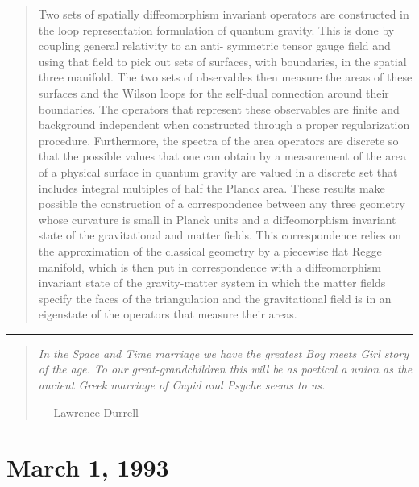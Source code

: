 \documentclass[12pt]{article}
\def\tightlist{}
\renewcommand{\texttt}[1]{%
  \begingroup
  \ttfamily
  \begingroup\lccode`~=`/\lowercase{\endgroup\def~}{/\discretionary{}{}{}}%
  \begingroup\lccode`~=`[\lowercase{\endgroup\def~}{[\discretionary{}{}{}}%
  \begingroup\lccode`~=`.\lowercase{\endgroup\def~}{.\discretionary{}{}{}}%
  \catcode`/=\active\catcode`[=\active\catcode`.=\active
  \scantokens{#1\noexpand}%
  \endgroup
}
\begin{document}
\begin{quote}
Two sets of spatially diffeomorphism invariant operators are constructed
in the loop representation formulation of quantum gravity. This is done
by coupling general relativity to an anti- symmetric tensor gauge field
and using that field to pick out sets of surfaces, with boundaries, in
the spatial three manifold. The two sets of observables then measure the
areas of these surfaces and the Wilson loops for the self-dual
connection around their boundaries. The operators that represent these
observables are finite and background independent when constructed
through a proper regularization procedure. Furthermore, the spectra of
the area operators are discrete so that the possible values that one can
obtain by a measurement of the area of a physical surface in quantum
gravity are valued in a discrete set that includes integral multiples of
half the Planck area. These results make possible the construction of a
correspondence between any three geometry whose curvature is small in
Planck units and a diffeomorphism invariant state of the gravitational
and matter fields. This correspondence relies on the approximation of
the classical geometry by a piecewise flat Regge manifold, which is then
put in correspondence with a diffeomorphism invariant state of the
gravity-matter system in which the matter fields specify the faces of
the triangulation and the gravitational field is in an eigenstate of the
operators that measure their areas.
\end{quote}

\begin{center}\rule{0.5\linewidth}{0.5pt}\end{center}

\begin{quote}
\emph{In the Space and Time marriage we have the greatest Boy meets Girl
story of the age. To our great-grandchildren this will be as poetical a
union as the ancient Greek marriage of Cupid and Psyche seems to us.}

--- Lawrence Durrell
\end{quote}



\hypertarget{week7}{%
\section{March 1, 1993}\label{week7}}

\end{document}
